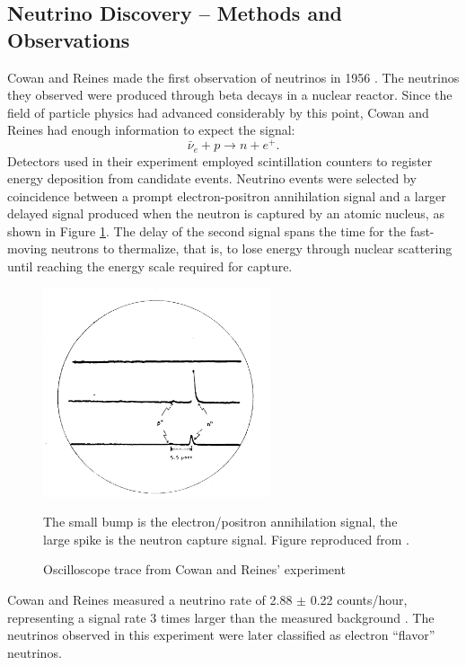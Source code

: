 \subsection{Neutrino Discovery -- Methods and Observations}
\label{discovery}


Cowan and Reines made the first observation of neutrinos in 1956
\cite{cowanNature}.
The neutrinos they observed were produced through beta decays in a nuclear
reactor.  Since the field of particle physics had advanced considerably by this
point, Cowan and Reines had enough information to expect the signal:
\begin{equation} \label{beta} \bar{\nu}_e + p \rightarrow n + e^+.  \end{equation}
Detectors used in their experiment employed scintillation counters to register
energy deposition from candidate events.  Neutrino events were selected by
coincidence between a prompt electron-positron annihilation signal and a larger delayed signal produced when the neutron is captured by an atomic
nucleus, as shown in Figure \ref{oscilloscope}.
The delay of the second signal spans the time for the fast-moving neutrons to
thermalize, that is, to lose energy through nuclear scattering until reaching
the energy scale required for capture.

\begin{figure}
  \begin{center}
    \includegraphics[width=0.6\textwidth]{figures/figures/cowanOscilloscope.png}
  \end{center}
  \caption{Oscilloscope trace from Cowan and Reines' experiment}{ The small
  bump is the electron/positron annihilation signal, the large spike is the
  neutron capture signal.  Figure reproduced from \cite{cowanNature}.}
  \label{oscilloscope}
\end{figure}
Cowan and Reines measured a neutrino rate of 2.88 $\pm$ 0.22 counts/hour,
representing a signal rate 3 times larger than the measured background
 \cite{cowan}.
The neutrinos observed in this experiment were later classified as
electron ``flavor''  neutrinos.

